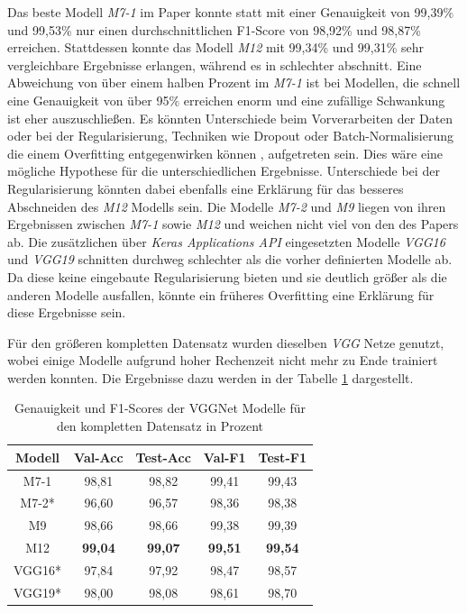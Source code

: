 \documentclass[twoside,a4paper]{IEEEtran}
\begin{document}
Das beste Modell \emph{M7-1} im Paper \cite{RHC} konnte statt mit einer Genauigkeit von 99,39\% und 99,53\% nur einen durchschnittlichen F1-Score von 98,92\% und 98,87\% erreichen. Stattdessen konnte das Modell \emph{M12} mit 99,34\% und 99,31\% sehr vergleichbare Ergebnisse erlangen, während es in \cite{RHC} schlechter abschnitt. Eine Abweichung von über einem halben Prozent im \emph{M7-1} ist bei Modellen, die schnell eine Genauigkeit von über 95\% erreichen enorm und eine zufällige Schwankung ist eher auszuschließen. Es könnten Unterschiede beim Vorverarbeiten der Daten oder bei der Regularisierung, Techniken wie Dropout oder Batch-Normalisierung die einem Overfitting entgegenwirken können \cite[S.27]{MACHINE_LEARNING}, aufgetreten sein. Dies wäre eine mögliche Hypothese für die unterschiedlichen Ergebnisse. Unterschiede bei der Regularisierung könnten dabei ebenfalls eine Erklärung für das besseres Abschneiden des \emph{M12} Modells sein. Die Modelle \emph{M7-2} und \emph{M9} liegen von ihren Ergebnissen zwischen \emph{M7-1} sowie \emph{M12} und weichen nicht viel von den des Papers \cite{RHC} ab. Die zusätzlichen über \emph{Keras Applications API} eingesetzten Modelle \emph{VGG16} und \emph{VGG19} schnitten durchweg schlechter als die vorher definierten Modelle ab. Da diese keine eingebaute Regularisierung bieten \cite{keras_vgg} und sie deutlich größer als die anderen Modelle ausfallen, könnte ein früheres Overfitting eine Erklärung für diese Ergebnisse sein.

Für den größeren kompletten Datensatz wurden dieselben \emph{VGG} Netze genutzt, wobei einige Modelle aufgrund hoher Rechenzeit nicht mehr zu Ende trainiert werden konnten. Die Ergebnisse dazu werden in der Tabelle \ref{vgg_ergebnis_full} dargestellt.
\begin{table}[!htb]
	\caption{Genauigkeit und F1-Scores der VGGNet Modelle für den kompletten Datensatz in Prozent}
	\label{vgg_ergebnis_full}
	\centering
	\begin{tabular}{|c|c|c|c|c|}
		\hline
		Modell & Val-Acc & Test-Acc & Val-F1 & Test-F1\\
		\hline 
		\hline 
		M7-1 & 98,81 & 98,82 & 99,41 & 99,43\\
		\hline
		M7-2* & 96,60 & 96,57 & 98,36 & 98,38\\
		\hline
		M9 & 98,66 & 98,66 & 99,38 & 99,39\\
		\hline 
		M12 & \textbf{99,04} & \textbf{99,07} & \textbf{99,51} & \textbf{99,54}\\
		\hline 
		VGG16* & 97,84 & 97,92 & 98,47 & 98,57\\
		\hline 
		VGG19* & 98,00 & 98,08 & 98,61 & 98,70\\
		\hline 
	\end{tabular}
\end{table}
\end{document}

